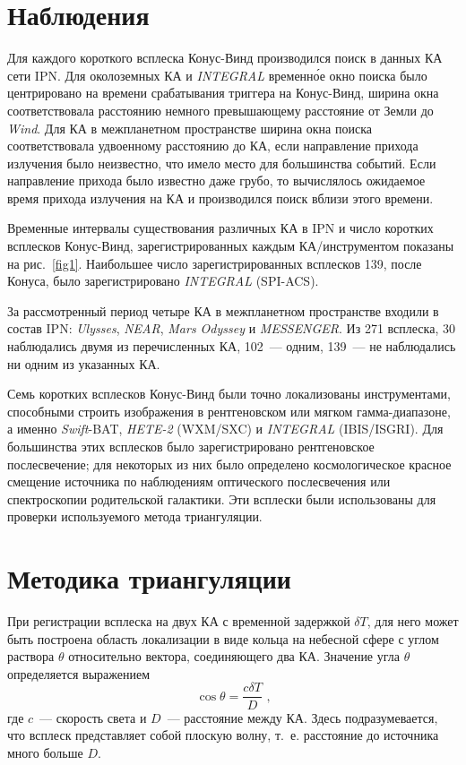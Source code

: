 \section{Наблюдения}
Для каждого короткого всплеска Конус-Винд производился поиск в данных КА сети IPN. 
Для околоземных КА и \textit{INTEGRAL} временн\'{о}е окно поиска было центрировано 
на времени срабатывания триггера на Конус-Винд, ширина окна соответствовала расстоянию 
немного превышающему расстояние от Земли до \textit{Wind}. Для КА в межпланетном 
пространстве ширина окна поиска соответствовала удвоенному расстоянию до КА, если 
направление прихода излучения было неизвестно, что имело место для большинства событий. 
Если направление прихода было известно даже грубо, то вычислялось ожидаемое время 
прихода излучения на КА и производился поиск вблизи этого времени.

Временные интервалы существования различных КА в IPN и число коротких всплесков 
Конус-Винд, зарегистрированных каждым КА/инструментом показаны на рис.~\ref{fig1}. 
Наибольшее число зарегистрированных всплесков 139, после Конуса, 
было зарегистрировано \textit{INTEGRAL} (SPI-ACS).


За рассмотренный период четыре КА в межпланетном пространстве входили в состав IPN: 
\textit{Ulysses}, \textit{NEAR}, \textit{Mars Odyssey} и \textit{MESSENGER}. 
Из 271 всплеска, 30 наблюдались двумя из перечисленных КА, 102~--- одним, 
139~--- не наблюдались ни одним из указанных КА.

Семь коротких всплесков Конус-Винд были точно локализованы инструментами, 
способными строить изображения в рентгеновском или мягком гамма-диапазоне, 
а именно \textit{Swift}-BAT, \textit{HETE-2} (WXM/SXC) и \textit{INTEGRAL} (IBIS/ISGRI). 
Для большинства этих всплесков было зарегистрировано рентгеновское послесвечение; 
для некоторых из них было определено космологическое красное смещение источника 
по наблюдениям оптического послесвечения или спектроскопии родительской галактики. 
Эти всплески были использованы для проверки используемого метода триангуляции.

\section{Методика триангуляции}
При регистрации всплеска на двух КА с временной задержкой $\delta T$, для него 
может быть построена область локализации в виде кольца на небесной сфере с углом 
раствора $\theta$ относительно вектора, соединяющего два КА. Значение угла $\theta$ определяется выражением
\begin{equation}
\cos \theta = \frac{c \delta T}{D} \mbox{ ,}
\end{equation}
где $c$~--- скорость света и $D$~--- расстояние между КА. Здесь подразумевается, 
что всплеск представляет собой плоскую волну, т.~е. расстояние до источника много больше $D$.

